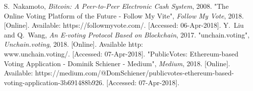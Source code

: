 \documentclass[conference]{IEEEtran}
\begin{document}
%
%
%
\begin{thebibliography}{1}

S.~Nakamoto, \emph{Bitcoin: A Peer-to-Peer Electronic Cash System}, 2008.
"The Online Voting Platform of the Future - Follow My Vite", \emph{Follow My Vote}, 2018. [Online]. Available: https://followmyvote.com/. [Accessed: 06-Apr-2018].
Y.~Liu and Q.~Wang, \emph{An E-voting Protocol Based on Blockchain}, 2017.
"unchain.voting", \emph{Unchain.voting}, 2018. [Online]. Available http:\\www.unchain.voting/. [Accessed: 07-Apr-2018].
"PublicVotes: Ethereum-based Voting Application - Dominik Schiener - Medium", \emph{Medium}, 2018. [Online]. Available: https://medium.com/@DomSchiener/publicvotes-ethereum-based-voting-application-3b691488b926. [Accessed: 07-Apr-2018].

\end{thebibliography}




\end{document}
